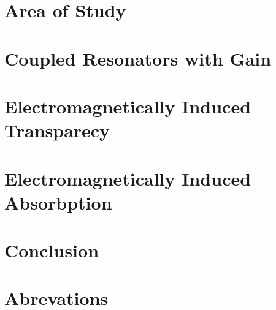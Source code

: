 \documentclass[12pt]{report}
\begin{document}
\chapter{Area of Study}

 
\chapter{Coupled Resonators with Gain}

 
\chapter{Electromagnetically Induced Transparecy}

 
\chapter{Electromagnetically Induced Absorbption}


\chapter{Conclusion}

\appendix
\chapter{Abrevations}

\end{document}
